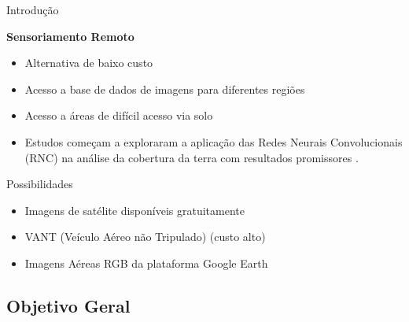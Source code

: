 \documentclass[%
  10pt,%
  aspectratio = 169,%
  compress,%
  t,%
  english,%
  brazilian,%
  tikz,
]{beamer}
\begin{document}
\begin{frame}{Introdução}

\textbf{Sensoriamento Remoto}

    \begin{itemize}
        \item Alternativa de baixo custo
        \item Acesso a base de dados de imagens para diferentes regiões
        \item Acesso a áreas de difícil acesso via solo
        \item Estudos começam a exploraram a aplicação das Redes Neurais Convolucionais (RNC) na análise da cobertura da terra com resultados promissores \cite{HU et al., 2013), (LI et al., 2020}.
    \end{itemize}

    \begin{block}{Possibilidades}
        \begin{itemize}
            \item Imagens de satélite disponíveis gratuitamente
            \item VANT (Veículo Aéreo não Tripulado) (custo alto)
            \item Imagens Aéreas RGB da plataforma Google Earth
        \end{itemize}
    \end{block}

\end{frame}



\subsection{Objetivo Geral}\label{ssec:intro1}
\end{document}
